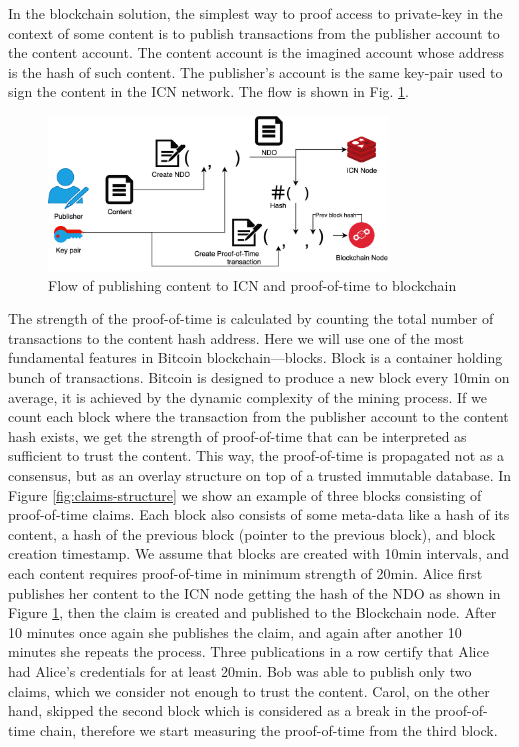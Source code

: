 In the blockchain solution, the simplest way to proof access to private-key in the context of some content is to publish transactions from the publisher account to the content account. The content account is the imagined account whose address is the hash of such content. The publisher's account is the same key-pair used to sign the content in the ICN network. The flow is shown in Fig. \ref{fig:distribution-flow}.
\begin{figure}[h!]
\includegraphics[width=9cm]{img/distribution-flow.png}
\centering
\caption{Flow of publishing content to ICN and proof-of-time to blockchain}
\label{fig:distribution-flow}
\end{figure} 
The strength of the proof-of-time is calculated by counting the total number of transactions to the content hash address. 
Here we will use one of the most fundamental features in Bitcoin blockchain––blocks. Block is a container holding bunch of transactions. Bitcoin is designed to produce a new block every 10min on average, it is achieved by the dynamic complexity of the mining process. If we count each block where the transaction from the publisher account to the content hash exists, we get the strength of proof-of-time that can be interpreted as sufficient to trust the content. This way, the proof-of-time is propagated not as a consensus, but as an overlay structure on top of a trusted immutable database. In Figure \ref{fig:claims-structure} we show an example of three blocks consisting of proof-of-time claims. Each block also consists of some meta-data like a hash of its content, a hash of the previous block (pointer to the previous block), and block creation timestamp. We assume that blocks are created with 10min intervals, and each content requires proof-of-time in minimum strength of 20min. Alice first publishes her content to the ICN node getting the hash of the NDO as shown in Figure \ref{fig:distribution-flow}, then the claim is created and published to the Blockchain node. After 10 minutes once again she publishes the claim, and again after another 10 minutes she repeats the process. Three publications in a row certify that Alice had Alice's credentials for at least 20min. Bob was able to publish only two claims, which we consider not enough to trust the content. Carol, on the other hand, skipped the second block which is considered as a break in the proof-of-time chain, therefore we start measuring the proof-of-time from the third block.
